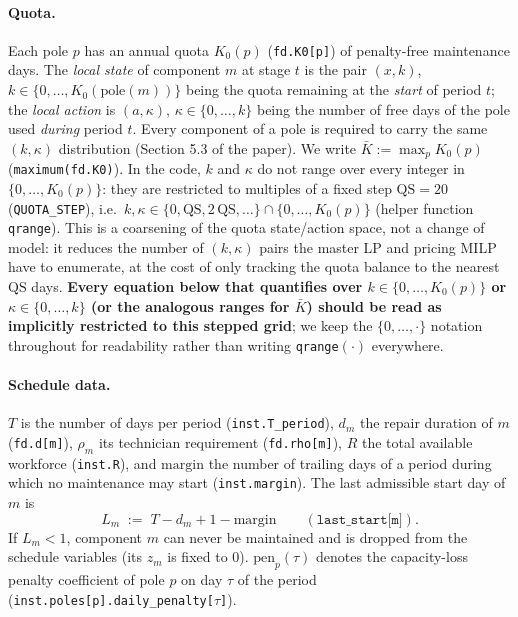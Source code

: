 \documentclass[11pt]{article}
\newcommand{\pole}{\mathrm{pole}}
\begin{document}
\paragraph{Quota.} Each pole $p$ has an annual quota $K_0(p)$ (\texttt{fd.K0[p]}) of
penalty-free maintenance days. The \emph{local state} of component $m$ at stage $t$ is the
pair $(x,k)$, $k \in \{0,\dots,K_0(\pole(m))\}$ being the quota remaining at the
\emph{start} of period $t$; the \emph{local action} is $(a,\kappa)$, $\kappa \in
\{0,\dots,k\}$ being the number of free days of the pole used \emph{during} period $t$.
Every component of a pole is required to carry the same $(k,\kappa)$ distribution
(Section 5.3 of the paper). We write $\bar K := \max_p K_0(p)$ (\texttt{maximum(fd.K0)}).
In the code, $k$ and $\kappa$ do not range over every integer in $\{0,\dots,K_0(p)\}$: they
are restricted to multiples of a fixed step $\mathrm{QS} = 20$ (\texttt{QUOTA\_STEP}), i.e.\
$k,\kappa \in \{0, \mathrm{QS}, 2\,\mathrm{QS}, \dots\} \cap \{0,\dots,K_0(p)\}$ (helper
function \texttt{qrange}). This is a coarsening of the quota state/action space, not a
change of model: it reduces the number of $(k,\kappa)$ pairs the master LP and pricing
MILP have to enumerate, at the cost of only tracking the quota balance to the nearest
$\mathrm{QS}$ days. \textbf{Every equation below that quantifies over $k \in
\{0,\dots,K_0(p)\}$ or $\kappa \in \{0,\dots,k\}$ (or the analogous ranges for
$\bar K$) should be read as implicitly restricted to this stepped grid}; we keep the
$\{0,\dots,\cdot\}$ notation throughout for readability rather than writing
\texttt{qrange}$(\cdot)$ everywhere.

\paragraph{Schedule data.} $T$ is the number of days per period (\texttt{inst.T\_period}),
$d_m$ the repair duration of $m$ (\texttt{fd.d[m]}), $\rho_m$ its technician requirement
(\texttt{fd.rho[m]}), $R$ the total available workforce (\texttt{inst.R}), and
$\mathrm{margin}$ the number of trailing days of a period during which no maintenance may
start (\texttt{inst.margin}). The last admissible start day of $m$ is
\[
  L_m \;:=\; T - d_m + 1 - \mathrm{margin} \qquad (\texttt{last\_start[m]}).
\]
If $L_m < 1$, component $m$ can never be maintained and is dropped from the schedule
variables (its $z_m$ is fixed to $0$). $\mathrm{pen}_p(\tau)$ denotes the capacity-loss
penalty coefficient of pole $p$ on day $\tau$ of the period
(\texttt{inst.poles[p].daily\_penalty[\ensuremath{\tau}]}).
\end{document}
